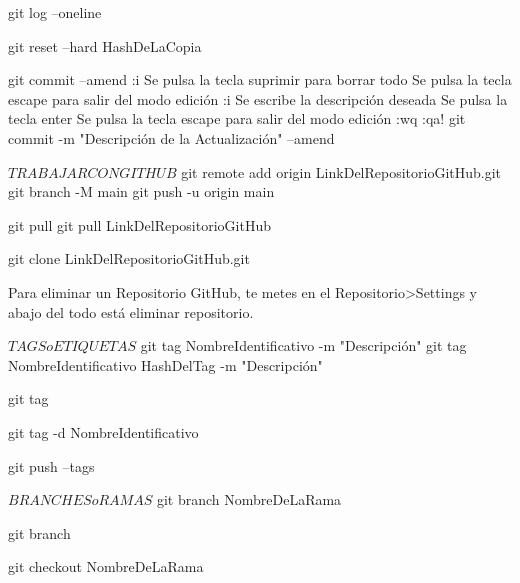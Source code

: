 	git log --oneline	%

	git reset --hard HashDeLaCopia	%

	git commit --amend		%
		:i		%
		Se pulsa la tecla suprimir para borrar todo
		Se pulsa la tecla escape para salir del modo edición
		:i		%
		Se escribe la descripción deseada
		Se pulsa la tecla enter
		Se pulsa la tecla escape para salir del modo edición
		:wq		%
		:qa!	%
	git commit -m "Descripción de la Actualización" --amend		%



$ TRABAJAR CON GITHUB $
	git remote add origin LinkDelRepositorioGitHub.git		%
	git branch -M main
	git push -u origin main									%

	git pull							%
	git pull LinkDelRepositorioGitHub	%

	git clone LinkDelRepositorioGitHub.git		%

	Para eliminar un Repositorio GitHub, te metes en el Repositorio>Settings y abajo del todo está eliminar repositorio.



$ TAGS o ETIQUETAS $
	git tag NombreIdentificativo -m "Descripción"				%
	git tag NombreIdentificativo HashDelTag -m "Descripción"	%

	git tag		%

	git tag -d NombreIdentificativo		%

	git push --tags		%


$ BRANCHES o RAMAS $
	git branch NombreDeLaRama	%
	
	git branch	%

	git checkout NombreDeLaRama		%

	





